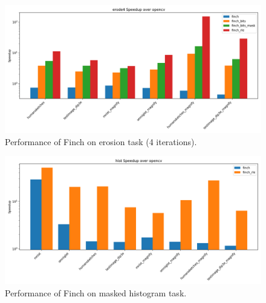 \documentclass[acmsmall]{acmart}
\begin{document}
\begin{figure}
	\includegraphics[width=\linewidth]{erode4_speedup_over_opencv.png}
    \caption{Performance of Finch on erosion task (4 iterations).}
\end{figure}

\begin{figure}
	\includegraphics[width=\linewidth]{hist_speedup_over_opencv.png}
    \caption{Performance of Finch on masked histogram task.}
\end{figure}
\end{document}
